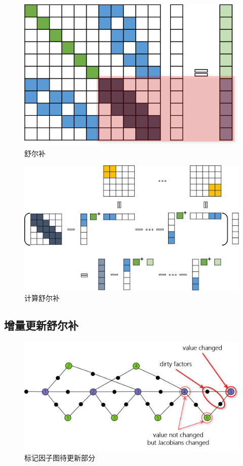 \begin{figure}[htbp]
    \centering
    \includegraphics{./figs/reduced_sys.png}
    \caption{舒尔补}
\end{figure}

\begin{figure}[htbp]
    \centering
    \includegraphics[width=\textwidth]{./figs/schur_complement.png}
    \caption{计算舒尔补}
\end{figure}

\subsection{增量更新舒尔补}

\begin{figure}[htbp]
    \centering
    \includegraphics[width=\textwidth]{./figs/fg_cursed.png}
    \caption{标记因子图待更新部分}
\end{figure}

